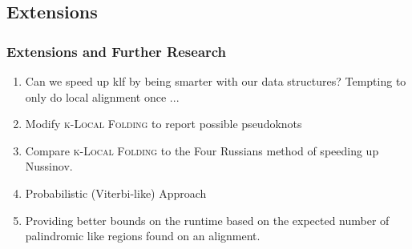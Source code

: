 \documentclass{beamer}
\newcommand{\klf}{\textsc{k-Local Folding} }
\begin{document}
\begin{frame}
\section{Extensions}
\frametitle{Extensions and Further Research}
\begin{enumerate}
\item Can we speed up klf by being smarter with our data structures? Tempting to only do local alignment once ... 
\item Modify \klf to report possible pseudoknots 
\item Compare \klf to the Four Russians method of speeding up Nussinov.
\item  Probabilistic (Viterbi-like) Approach
\item Providing better bounds on the runtime based on the expected number of palindromic like regions found on an alignment. 
\end{enumerate}
\end{frame}
\end{document}
